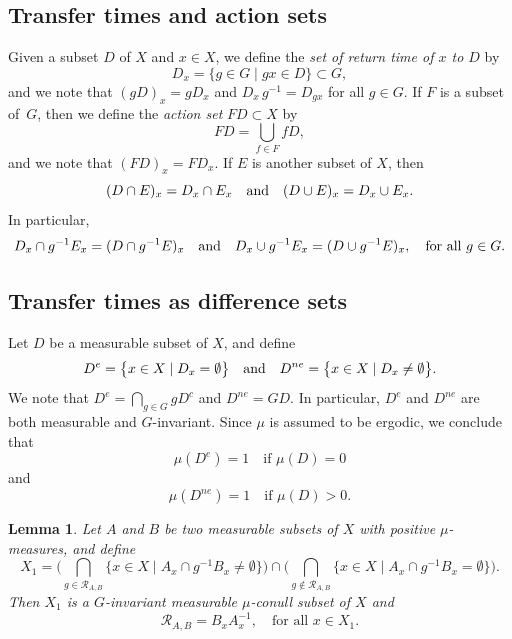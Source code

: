 \documentclass[JEP,XML,SOM,Unicode]{cedram}
\let\mathcal\mathscr
\newcommand{\cR}{\mathcal{R}}
\newcommand{\qand}{\quad\textup{and}\quad}
\theoremstyle{plain}
\newtheorem{lemma}[theorem]{Lemma}
\theoremstyle{definition}
\begin{document}
\subsection{Transfer times and action sets}
\label{subsec:deftransfer}
Given a subset $D$ of $X$ and $x \in X$, we define the \emph{set of return time of $x$ to $D$} by
\[
D_x = \bigl\{ g \in G \mid  gx \in D \bigr\} \subset G,
\]
and we note that $(gD)_x = gD_x$ and $D_x \, g^{-1} = D_{gx}$ for all $g \in G$.
If $F$ is a subset of~$G$, then we define the \emph{action set} $FD \subset X$ by
\[
FD = \bigcup_{f \in F} fD,
\]
and we note that $(FD)_x = F D_x$. If $E$ is another subset of $X$, then
\[
(D \cap E)_x = D_x \cap E_x \qand (D \cup E)_x = D_x \cup E_x.
\]
In particular,
\begin{equation}
\label{eq_DcapE}
D_x \cap g^{-1} E_x = (D \cap g^{-1} E)_x \qand D_x \cup g^{-1} E_x = (D \cup g^{-1} E)_x, \quad \textrm{for all $g \in G$}.
\end{equation}

\subsection{Transfer times as difference sets}

Let $D$ be a measurable subset of $X$, and define
\[
D^{e} = \bigl\{ x \in X \mid  D_x = \emptyset \bigr\}
\qand
D^{ne} = \bigl\{ x \in X \mid  D_x \neq \emptyset \bigr\}.
\]
We note that $D^{e} = \bigcap_{g \in G} gD^c$ and $D^{ne} = GD$. In particular, $D^e$ and $D^{ne}$ are both measurable and $G$-invariant.
Since $\mu$ is assumed to be ergodic, we conclude that
\begin{equation}
\label{De}
\mu(D^e) = 1 \quad \textrm{if $\mu(D) = 0$}
\end{equation}
and
\begin{equation}
\label{Dne}
\mu(D^{ne}) = 1 \quad \textrm{if $\mu(D) > 0$}.
\end{equation}

\begin{lemma}
\label{lemma_passtoreturns}
Let $A$ and $B$ be two measurable subsets of $X$ with positive $\mu$-measures, and define
\[
X_1 = \Big( \bigcap_{g \in \cR_{A,B}} \bigl\{ x \in X \mid  A_x \cap g^{-1}B_x \neq \emptyset \bigr\} \Big)
\cap
\Big( \bigcap_{g \notin \cR_{A,B}} \bigl\{ x \in X \mid  A_x \cap g^{-1} B_x = \emptyset \bigr\} \Big).
\]
Then $X_1$ is a $G$-invariant measurable $\mu$-conull subset of $X$ and
\[
\cR_{A,B} = B_x A_x^{-1}, \quad \textrm{for all $x \in X_1$}.
\]
\end{lemma}
\end{document}
